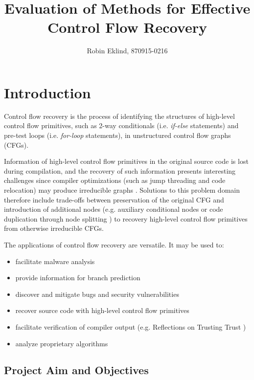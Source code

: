 \documentclass[12pt, a4paper]{article}
\title{Evaluation of Methods for Effective Control Flow Recovery}
\author{Robin Eklind, 870915-0216}
\begin{document}
\maketitle

\clearpage

\tableofcontents

\clearpage

\section{Introduction}

Control flow recovery is the process of identifying the structures of high-level control flow primitives, such as 2-way conditionals (i.e. \textit{if-else} statements) and pre-test loops (i.e. \textit{for-loop} statements), in unstructured control flow graphs (CFGs).

Information of high-level control flow primitives in the original source code is lost during compilation, and the recovery of such information presents interesting challenges since compiler optimizations (such as jump threading and code relocation) may produce irreducible graphs \cite{cifuentes_reverse_comp}. Solutions to this problem domain therefore include trade-offs between preservation of the original CFG and introduction of additional nodes (e.g. auxiliary conditional nodes \cite{no_more_gotos} or code duplication through node splitting \cite{node_splitting}) to recovery high-level control flow primitives from otherwise irreducible CFGs.

The applications of control flow recovery are versatile. It may be used to:

\begin{itemize}
	\item facilitate malware analysis
	\item provide information for branch prediction
	\item discover and mitigate bugs and security vulnerabilities
	\item recover source code with high-level control flow primitives
	\item facilitate verification of compiler output (e.g. Reflections on Trusting Trust \cite{trusting_trust})
	\item analyze proprietary algorithms
\end{itemize}

\subsection{Project Aim and Objectives}
\end{document}
